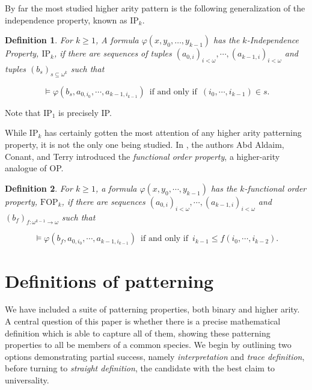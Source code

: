\documentclass[10pt,a4paper]{amsart}
\newcommand{\IFF}{\enspace\text{if and only if}\enspace}
\newcommand{\vphi}{\varphi}
\newtheorem{definition}{Definition}
\begin{document}
By far the most studied higher arity pattern is the following generalization of the independence property, known as $\text{IP}_k$.

\begin{definition}\label{IPk definition}
    For $k\geq 1$, A formula $\vphi(x, y_0, \dots, y_{k-1})$ has the $k$-\textit{Independence Property}, $\text{IP}_k$, if there are sequences of tuples $(a_{0,i})_{i<\omega},\dotsm, (a_{k-1,i})_{i< \omega}$ and tuples $(b_s)_{s\subseteq\omega^k}$ such that 

    \[\models \vphi(b_s, a_{0,i_0},\dotsm, a_{k-1,i_{k-1}})\IFF (i_0, \dotsm ,i_{k-1})\in s.\]


    
\end{definition}

Note that $\text{IP}_1$ is precisely IP. 

While $\text{IP}_k$ has certainly gotten the most attention of any higher arity patterning property, it is not the only one being studied. In \cite{abd2025higher}, the authors Abd Aldaim, Conant, and Terry introduced the \textit{functional order property}, a higher-arity analogue of OP.

\begin{definition}\label{FOPk defn}
    For $k\geq 1$, a formula $\vphi(x, y_0,\dotsm, y_{k-1})$ has the $k$-\textit{functional order property}, $\text{FOP}_k$, if there are sequences $(a_{0,i})_{i<\omega},\dotsm, (a_{k-1,i})_{i < \omega}$ and $(b_f)_{f\colon \omega^{k-1}\to\omega}$ such that 

    \[\models \vphi (b_f, a_{0,i_0},\dotsm, a_{k-1,i_{k-1}})\IFF i_{k-1}\leq f(i_0,\dotsm, i_{k-2}).\]

\end{definition}


\section{Definitions of patterning}\label{Definitions of patterning}

We have included a suite of patterning properties, both binary and higher arity. A central question of this paper is whether there is a precise mathematical definition which is able to capture all of them, showing these patterning properties to all be members of a common species. We begin by outlining two options demonstrating partial success, namely \textit{interpretation} and \textit{trace definition}, before turning to \textit{straight definition}, the candidate with the best claim to universality.
\end{document}
